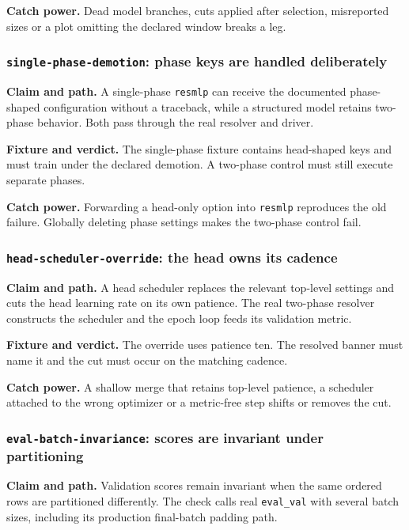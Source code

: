 \documentclass[10pt,aps,prd,twocolumn,nofootinbib]{revtex4-2}
\newcommand{\code}[1]{\texttt{#1}}
\begin{document}
\textbf{Catch power.}  Dead model branches, cuts applied after selection,
misreported sizes or a plot omitting the declared window breaks a leg.

\subsubsection{\code{single-phase-demotion}: phase keys are handled deliberately}

\textbf{Claim and path.}  A single-phase \code{resmlp} can receive the
documented phase-shaped configuration without a traceback, while a structured
model retains two-phase behavior.  Both pass through the real resolver and
driver.

\textbf{Fixture and verdict.}  The single-phase fixture contains head-shaped
keys and must train under the declared demotion.  A two-phase control must
still execute separate phases.

\textbf{Catch power.}  Forwarding a head-only option into \code{resmlp}
reproduces the old failure.  Globally deleting phase settings makes the
two-phase control fail.

\subsubsection{\code{head-scheduler-override}: the head owns its cadence}

\textbf{Claim and path.}  A head scheduler replaces the relevant top-level
settings and cuts the head learning rate on its own patience.  The real
two-phase resolver constructs the scheduler and the epoch loop feeds its
validation metric.

\textbf{Fixture and verdict.}  The override uses patience ten.  The resolved
banner must name it and the cut must occur on the matching cadence.

\textbf{Catch power.}  A shallow merge that retains top-level patience, a
scheduler attached to the wrong optimizer or a metric-free step shifts or
removes the cut.

\subsubsection{\code{eval-batch-invariance}: scores are invariant under partitioning}

\textbf{Claim and path.}  Validation scores remain invariant when the same
ordered rows are partitioned differently.  The check calls real \code{eval\_val} with
several batch sizes, including its production final-batch padding path.
\end{document}
